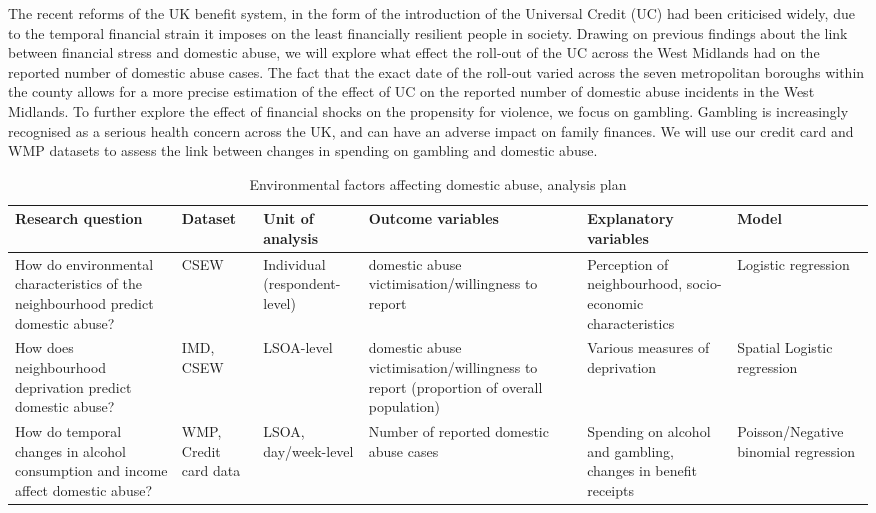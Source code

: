 \documentclass[11pt, a4paper]{article}
\begin{document}
 The recent reforms of the UK benefit system, in the form of the introduction of the Universal Credit (UC) had been criticised widely, due to the temporal financial strain it imposes on the least financially resilient people in society. Drawing on previous findings about the link between financial stress and domestic abuse, we will explore what effect the roll-out of the UC across the West Midlands had on the reported number of domestic abuse cases. The fact that the exact date of the roll-out varied across the seven metropolitan boroughs within the county allows for a more precise estimation of the effect of UC on the reported number of domestic abuse incidents in the West Midlands. To further explore the effect of financial shocks on the propensity for violence, we focus on gambling. Gambling is increasingly recognised as a serious health concern across the UK, and can have an adverse impact on family finances. We will use our credit card and WMP datasets to assess the link between changes in spending on gambling and domestic abuse.



\begin{table}[!htbp]
\caption{Environmental factors affecting domestic abuse, analysis plan}
  \begin{threeparttable}[t]
  \centering
       \begin{tabular}{ L{2.8cm}  C{1.8cm}  C{1.8cm}  C{3.2cm}  C{2.8cm}  C{2cm} }
    \toprule
     \textbf{Research question} & \textbf{Dataset}    & \textbf{Unit of analysis} & \textbf{Outcome variables} & \textbf{Explanatory variables} & \textbf{Model} \\
    \midrule
    How do environmental characteristics of the neighbourhood predict domestic abuse? & CSEW & Individual (respondent-level) & domestic abuse victimisation/willingness to report & Perception of neighbourhood, socio-economic characteristics & Logistic regression \\
         \midrule
          How does neighbourhood deprivation predict domestic abuse? & IMD, CSEW & LSOA-level & domestic abuse victimisation/willingness to report (proportion of overall population) & Various measures of deprivation & Spatial Logistic regression \\
         \midrule
    How do temporal changes in alcohol consumption and income affect domestic abuse? & WMP, Credit card data & LSOA, day/week-level & Number of reported domestic abuse cases & Spending on alcohol and gambling, changes in benefit receipts & Poisson/Negative binomial regression \\

     \bottomrule
  \end{tabular}
    \end{threeparttable}%
  \label{tab:addlabel}%
\end{table}%
\end{document}
